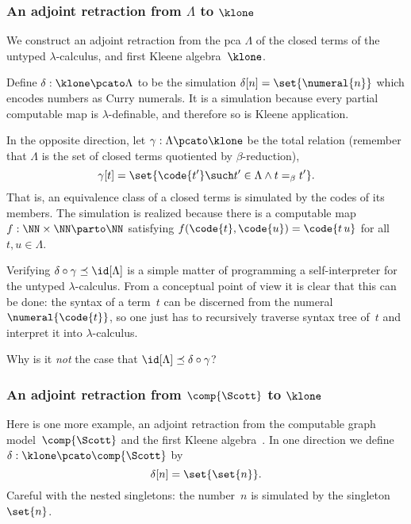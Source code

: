 \subsubsection{An adjoint retraction from $\Lambda$ to $\klone$}
\label{sec:adjo-retr-from}

We construct an adjoint retraction from the pca $\Lambda$ of the closed terms of the untyped $\lambda$-calculus, and first Kleene algebra~$\klone$.

Define $\delta : \klone \pcato \Lambda$ to be the simulation $\delta[n] = \set{\numeral{n}}$ which encodes numbers as Curry numerals.
%
It is a simulation because every partial computable map is $\lambda$-definable, and therefore so is Kleene application.

In the opposite direction, let $\gamma : \Lambda \pcato \klone$ be the total relation (remember that $\Lambda$ is the set of closed terms quotiented by $\beta$-reduction),
%
\begin{equation*}
  \gamma[t] = \set{ \code{t'} \such t' \in \Lambda \land t =_\beta t' }.
\end{equation*}
%
That is, an equivalence class of a closed terms is simulated by the codes of its members.
The simulation is realized because there is a computable map~$f : \NN \times \NN \parto \NN$ satisfying $f(\code{t}, \code{u}) = \code{t \, u}$ for all $t, u \in \Lambda$.

Verifying $\delta \circ \gamma \preceq \id[\Lambda]$ is a simple matter of programming a self-interpreter for the untyped $\lambda$-calculus. From a conceptual point of view it is clear that this can be done: the syntax of a term~$t$ can be discerned from the numeral $\numeral{\code{t}}$, so one just has to recursively traverse syntax tree of~$t$ and interpret it into $\lambda$-calculus.

\begin{exercise}
  Why is it \emph{not} the case that $\id[\Lambda] \preceq \delta \circ \gamma$?
\end{exercise}

\subsubsection{An adjoint retraction from $\comp{\Scott}$ to $\klone$}
\label{ex:pcamorphism_K1_RE}%

%
%
Here is one more example, an adjoint retraction from the computable graph model~$\comp{\Scott}$ and the first Kleene algebra~\cite[Proposition 3.3.7]{Longley:94}.
%
In one direction we define $\delta: \klone \pcato \comp{\Scott}$ by
%
\begin{equation*}
  \delta[n] = \set{\set{n}}.
\end{equation*}
%
Careful with the nested singletons: the number~$n$ is simulated by the singleton $\set{n}$.

